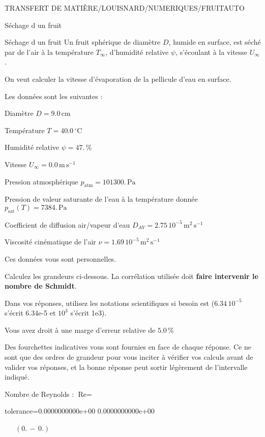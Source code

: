 \documentclass[12pt]{article}
\begin{document}
\begin{quiz}{TRANSFERT DE MATIÈRE/LOUISNARD/NUMERIQUES/FRUITAUTO}
\begin{cloze}{Séchage d un fruit}
\end{cloze} 


 \begin{cloze}{Séchage d un fruit} 
Un fruit sphérique de diamètre $D$, humide en surface, est séché par de l'air à la température $T_\infty$, d'humidité relative $\psi$, s'écoulant à la vitesse $U_\infty$.

On veut calculer la vitesse d'évaporation de la pellicule d'eau en surface.

 

Les données sont les suivantes :

 

Diamètre $D = 9.0\,  \mathrm{cm} $

Température $T = 40.0\,  \mathrm{^\circ\mathrm{C}} $

Humidité relative $\psi = 47.\, \% $

Vitesse $U_\infty = 0.0\,  \mathrm{m}\,  \mathrm{s}^{-1} $

Pression atmosphérique $p_{\text{atm}} = 101300.\,  \mathrm{Pa} $

Pression de valeur saturante de l’eau à la température donnée $p_{\text{sat}}(T) = 7384.\,  \mathrm{Pa} $

Coefficient de diffusion air/vapeur d’eau $D_{AV} =  2.75 \, 10^{-5} \,  \mathrm{m}^{2}\,  \mathrm{s}^{-1} $

Viscosité cinématique de l’air $\nu =  1.69 \, 10^{-5} \,  \mathrm{m}^{2}\,  \mathrm{s}^{-1} $

Ces données vous sont personnelles.

 

Calculez les grandeurs ci-dessous. La corrélation utilisée doit \textbf{faire intervenir le nombre de Schmidt}.

Dans vos réponses, utilisez les notations scientifiques si besoin est ($6.34\, 10^{-5}$ s'écrit 6.34e-5 et $10^{3}$ s'écrit 1e3).

Vous avez droit à une marge d'erreur relative de $5.0\, \% $

Des fourchettes indicatives vous sont fournies en face de chaque réponse. Ce ne sont que des ordres de grandeur pour vous inciter à vérifier vos calculs avant de valider vos réponses, et la bonne réponse peut sortir légèrement de l'intervalle indiqué.

 

Nombre de Reynolds : $\text{Re} =  $
\begin{numerical}[points=1] 
\item[tolerance={0.0000000000e+00}] 0.0000000000e+00 
\end{numerical} 
 $\,$ 
 $ \quad (0. \, - \, 0.) $ 


\end{cloze}
\end{quiz}
\end{document}
